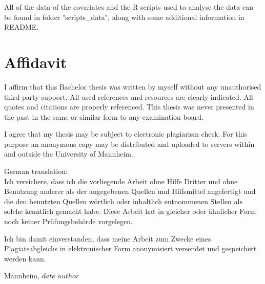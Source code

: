 \documentclass{scrbook}
\begin{document}
\noindent All of the data of the covariates and the R scripts used to analyse the data can be found in folder "scripts\_data", along with some additional information in README.



\chapter{Affidavit}
\thispagestyle{empty}

I affirm that this Bachelor thesis was written by myself without any unauthorised third-party support. All used references and resources are clearly indicated. All quotes and citations are properly referenced. This thesis was never presented in the past in the same or similar form to any examination board. 

\noindent I agree that my thesis may be subject to electronic plagiarism check. For this purpose an anonymous copy may be distributed and uploaded to
servers within and outside the University of Mannheim.

\vspace{2\baselineskip}

\noindent German translation:\\
Ich versichere, dass ich die vorliegende Arbeit ohne Hilfe Dritter und ohne Benutzung anderer
als der angegebenen Quellen und Hilfsmittel angefertigt und die den benutzten Quellen
wörtlich oder inhaltlich entnommenen Stellen als solche kenntlich gemacht habe. Diese Arbeit
hat in gleicher oder ähnlicher Form noch keiner Prüfungsbehörde vorgelegen.

\noindent Ich bin damit einverstanden, dass meine Arbeit zum Zwecke eines Plagiatsabgleichs in
elektronischer Form anonymisiert versendet und gespeichert werden kann.

\vspace{4\baselineskip}
\begin{center}
\parbox{.8\textwidth}{Mannheim, $date$ \hfill $author$}
\end{center}


 
\end{document}
